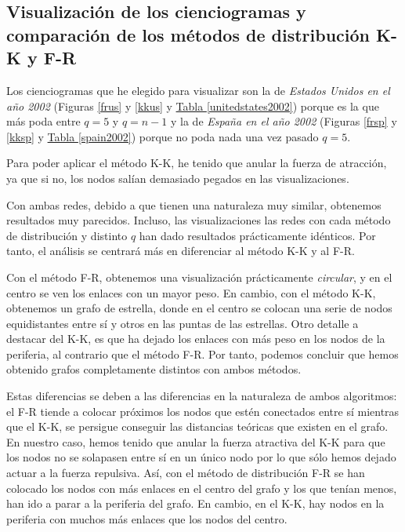 \documentclass[10pt,a4paper,spanish]{article}
\numberwithin{equation}{section} %
\numberwithin{figure}{section} %
\numberwithin{table}{section} %
\begin{document}
\subsection{Visualización de los cienciogramas y comparación de los métodos de distribución K-K y F-R}

Los cienciogramas que he elegido para visualizar son la de \textit{Estados Unidos en el año 2002} (Figuras \hyperref[frus]{\ref*{frus}} y \hyperref[kkus]{\ref*{kkus}} y \hyperref[unitedstates2002]{Tabla \ref*{unitedstates2002}}) porque es la que más poda entre $q = 5$ y $q = n-1$ y la de \textit{España en el año 2002} (Figuras \hyperref[frsp]{\ref*{frsp}} y \hyperref[kksp]{\ref*{kksp}} y \hyperref[spain2002]{Tabla \ref*{spain2002}}) porque no poda nada una vez pasado $q = 5$.

Para poder aplicar el método K-K, he tenido que anular la fuerza de atracción, ya que si no, los nodos salían demasiado pegados en las visualizaciones.

Con ambas redes, debido a que tienen una naturaleza muy similar, obtenemos resultados muy parecidos. Incluso, las visualizaciones las redes con cada método de distribución y distinto $q$ han dado resultados prácticamente idénticos. Por tanto, el análisis se centrará más en diferenciar al método K-K y al F-R.

Con el método F-R, obtenemos una visualización prácticamente \textit{circular}, y en el centro se ven los enlaces con un mayor peso. En cambio, con el método K-K, obtenemos un grafo de estrella, donde en el centro se colocan una serie de nodos equidistantes entre sí y otros en las puntas de las estrellas. Otro detalle a destacar del K-K, es que ha dejado los enlaces con más peso en los nodos de la periferia, al contrario que el método F-R. Por tanto, podemos concluir que hemos obtenido grafos completamente distintos con ambos métodos.

Estas diferencias se deben a las diferencias en la naturaleza de ambos algoritmos: el F-R tiende a colocar próximos los nodos que estén conectados entre sí mientras que el K-K, se persigue conseguir las distancias teóricas que existen en el grafo. En nuestro caso, hemos tenido que anular la fuerza atractiva del K-K para que los nodos no se solapasen entre sí en un único nodo por lo que sólo hemos dejado actuar a la fuerza repulsiva. Así, con el método de distribución F-R se han colocado los nodos con más enlaces en el centro del grafo y los que tenían menos, han ido a parar a la periferia del grafo. En cambio, en el K-K, hay nodos en la periferia con muchos más enlaces que los nodos del centro.
\end{document}
